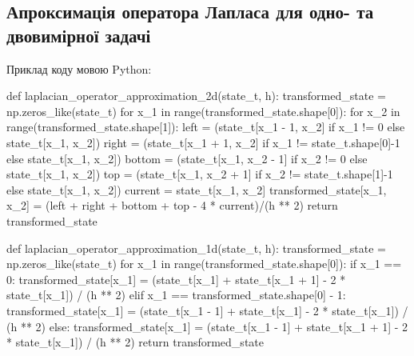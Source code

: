 \documentclass[a4paper,12pt]{extreport}
\begin{document}
\subsection*{Апроксимація оператора Лапласа для одно- та двовимірної задачі}
Приклад коду мовою Python:
\begin{python}
def laplacian_operator_approximation_2d(state_t, h):
    transformed_state = np.zeros_like(state_t)
    for x_1 in range(transformed_state.shape[0]):
        for x_2 in range(transformed_state.shape[1]):
            left = (state_t[x_1 - 1, x_2] if x_1 != 0 else state_t[x_1, x_2])
            right = (state_t[x_1 + 1, x_2] if x_1 != state_t.shape[0]-1 else state_t[x_1, x_2])
            bottom = (state_t[x_1, x_2 - 1] if x_2 != 0 else state_t[x_1, x_2])
            top = (state_t[x_1, x_2 + 1] if x_2 != state_t.shape[1]-1 else state_t[x_1, x_2])
            current = state_t[x_1, x_2]
            transformed_state[x_1, x_2] = (left + right + bottom + top - 4 * current)/(h ** 2)
    return transformed_state


def laplacian_operator_approximation_1d(state_t, h):
    transformed_state = np.zeros_like(state_t)
    for x_1 in range(transformed_state.shape[0]):
        if x_1 == 0:
            transformed_state[x_1] = (state_t[x_1] + state_t[x_1 + 1] - 2 * state_t[x_1]) / (h ** 2)
        elif x_1 == transformed_state.shape[0] - 1:
            transformed_state[x_1] = (state_t[x_1 - 1] + state_t[x_1] - 2 * state_t[x_1]) / (h ** 2)
        else:
             transformed_state[x_1] = (state_t[x_1 - 1] + state_t[x_1 + 1] - 2 * state_t[x_1]) / (h ** 2)
    return transformed_state
\end{python}
\newpage
\end{document}
